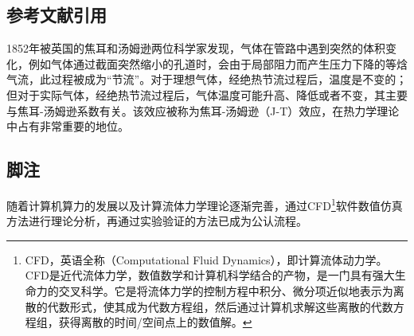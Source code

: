 \subsection{参考文献引用}

1852年被英国的焦耳和汤姆逊两位科学家发现，气体在管路中遇到突然的体积变化，例如气体通过截面突然缩小的孔道时，会由于局部阻力而产生压力下降的等焓气流，此过程被成为“节流”。对于理想气体，经绝热节流过程后，温度是不变的；但对于实际气体，经绝热节流过程后，气体温度可能升高、降低或者不变，其主要与焦耳-汤姆逊系数有关\cite{程阳2015气体静压节流器微流场焦耳}。该效应被称为焦耳-汤姆逊（J-T）效应，在热力学理论中占有非常重要的地位。

\subsection{脚注}

随着计算机算力的发展以及计算流体力学理论逐渐完善，通过CFD\footnote{CFD，英语全称（Computational Fluid Dynamics），即计算流体动力学。CFD是近代流体力学，数值数学和计算机科学结合的产物，是一门具有强大生命力的交叉科学。它是将流体力学的控制方程中积分、微分项近似地表示为离散的代数形式，使其成为代数方程组，然后通过计算机求解这些离散的代数方程组，获得离散的时间/空间点上的数值解。}软件数值仿真方法进行理论分析，再通过实验验证的方法已成为公认流程。

\newpage


